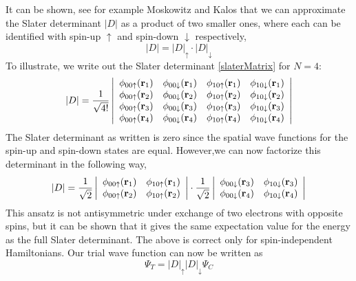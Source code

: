\documentclass[english, a4paper]{article}
\begin{document}
It can be shown, see for example Moskowitz and Kalos \cite{ref3} that we can approximate the Slater
determinant $|D|$ as a product of two smaller ones, where each can be identified with
spin-up $\uparrow$ and spin-down $\downarrow$ respectively,
\begin{equation}
 |D| = |D|_\uparrow \cdot |D|_\downarrow
\end{equation}
To illustrate, we write out the Slater determinant \eqref{slaterMatrix} for $N=4$:
\begin{equation}
    |D| = \frac{1}{\sqrt{4!}} \left|\begin{array}{cccc}
\phi_{00\uparrow}({\bf r}_1) &\phi_{00\downarrow}({\bf r}_1) 
&\phi_{10\uparrow}({\bf r}_1) &\phi_{10\downarrow}({\bf r}_1) \\
\phi_{00\uparrow}({\bf r}_2) &\phi_{00\downarrow}({\bf r}_2) 
&\phi_{10\uparrow}({\bf r}_2) &\phi_{10\downarrow}({\bf r}_2) \\
\phi_{00\uparrow}({\bf r}_3) &\phi_{00\downarrow}({\bf r}_3) 
&\phi_{10\uparrow}({\bf r}_3) &\phi_{10\downarrow}({\bf r}_3) \\
\phi_{00\uparrow}({\bf r}_4) &\phi_{00\downarrow}({\bf r}_4) 
&\phi_{10\uparrow}({\bf r}_4) &\phi_{10\downarrow}({\bf r}_4) \\
                      \end{array} \right|
\end{equation}
The Slater determinant as written is zero since the spatial wave functions for the
spin-up and spin-down states are equal. 
However,we can now factorize this determinant in the following way,
\begin{equation}
|D| = \frac{1}{\sqrt{2}}\left|\begin{array}{cc}
\phi_{00\uparrow}({\bf r}_1) &\phi_{10\uparrow}({\bf r}_1) \\
\phi_{00\uparrow}({\bf r}_2) &\phi_{10\uparrow}({\bf r}_2) \\
            \end{array} \right|
\cdot
\frac{1}{\sqrt{2}} \left| \begin{array}{cc}
\phi_{00\downarrow}({\bf r}_3) &\phi_{10\downarrow}({\bf r}_3) \\
\phi_{00\downarrow}({\bf r}_4) &\phi_{10\downarrow}({\bf r}_4) \\
       \end{array} \right|
       \label{SlaterDetFactorized}
\end{equation}
This ansatz is not antisymmetric under exchange of two electrons with opposite spins, but it can 
be shown that it gives the same expectation value for the energy as the full Slater determinant. 
The above is correct only for spin-independent Hamiltonians. Our trial wave function
can now be written as
\begin{equation}
 \Psi_T = |D|_\uparrow |D|_\downarrow \Psi_C
\end{equation}
\end{document}
